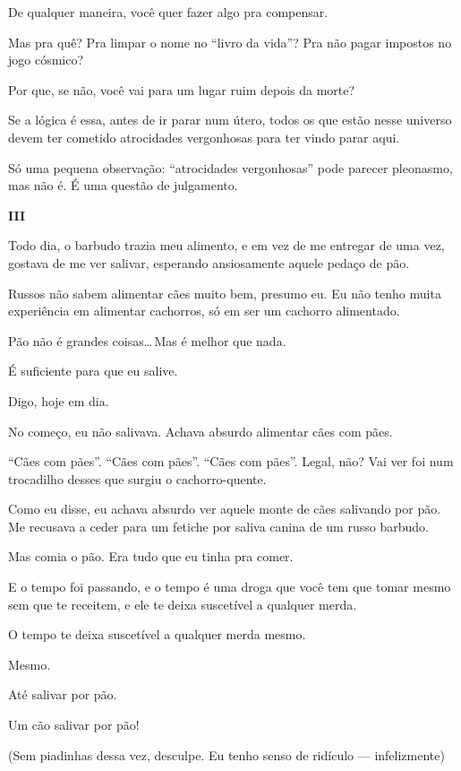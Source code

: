 De qualquer maneira, você quer fazer algo pra compensar.

Mas pra quê? Pra limpar o nome no ``livro da vida''? Pra não pagar impostos no jogo cósmico?

Por que, se não, você vai para um lugar ruim depois da morte?

Se a lógica é essa, antes de ir parar num útero, todos os que estão nesse universo devem ter cometido atrocidades vergonhosas para ter vindo parar aqui.

Só uma pequena observação: ``atrocidades vergonhosas'' pode parecer pleonasmo, mas não é. É uma questão de julgamento.

\begin{center}
{\Large \textbf{III}}
\end{center}

Todo dia, o barbudo trazia meu alimento, e em vez de me entregar de uma vez, gostava de me ver salivar, esperando ansiosamente aquele pedaço de pão.

\enlargethispage{\baselineskip}

Russos não sabem alimentar cães muito bem, presumo eu. Eu não tenho muita experiência em alimentar cachorros, só em ser um cachorro alimentado.

Pão não é grandes coisas\ldots\,Mas é melhor que nada.

É suficiente para que eu salive.

Digo, hoje em dia.

No começo, eu não salivava. Achava absurdo alimentar cães com pães.

``Cães com pães''. ``Cães com pães''. ``Cães com pães''. Legal, não? Vai ver foi num trocadilho desses que surgiu o ca\-chor\-ro-quen\-te.

Como eu disse, eu achava absurdo ver aquele monte de cães salivando por pão. Me recusava a ceder para um fetiche por saliva canina de um russo barbudo.

Mas comia o pão. Era tudo que eu tinha pra comer.

E o tempo foi passando, e o tempo é uma droga que você tem que tomar mesmo sem que te receitem, e ele te deixa suscetível a qualquer merda.

O tempo te deixa suscetível a qualquer merda mesmo.

Mesmo.

Até salivar por pão.

Um cão salivar por pão!

(Sem piadinhas dessa vez, desculpe. Eu tenho senso de ridículo --- infelizmente)

